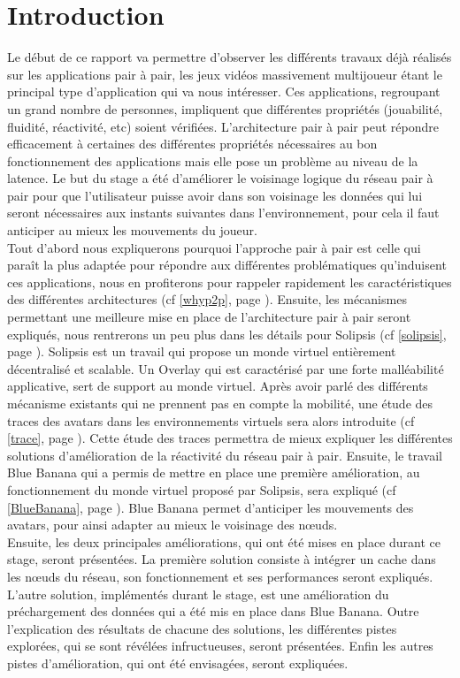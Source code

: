 \section{Introduction}
	Le début de ce rapport va permettre d'observer les différents travaux déjà réalisés sur les applications pair à pair, les jeux vidéos massivement multijoueur étant le principal type d'application qui va nous intéresser. Ces applications, regroupant un grand nombre de personnes, impliquent que différentes propriétés (jouabilité, fluidité, réactivité, etc) soient vérifiées. L'architecture pair à pair peut répondre efficacement à certaines des différentes propriétés nécessaires au bon fonctionnement des applications mais elle pose un problème au niveau de la latence. Le but du stage a été d'améliorer le voisinage logique du réseau pair à pair pour que l'utilisateur puisse avoir dans son voisinage les données qui lui seront nécessaires aux instants suivantes dans l'environnement, pour cela il faut anticiper au mieux les mouvements du joueur.\\

	Tout d'abord nous expliquerons pourquoi l'approche pair à pair est celle qui paraît la plus adaptée pour répondre aux différentes problématiques qu'induisent ces applications, nous en profiterons pour rappeler rapidement les caractéristiques des différentes architectures (cf \ref{whyp2p}, page \pageref{whyp2p}). Ensuite, les mécanismes permettant une meilleure mise en place de l'architecture pair à pair seront expliqués, nous rentrerons un peu plus dans les détails pour Solipsis (cf \ref{solipsis}, page \pageref{solipsis}). Solipsis est un travail qui propose un monde virtuel entièrement décentralisé et scalable. Un Overlay qui est caractérisé par une forte malléabilité applicative, sert de support au monde virtuel. Après avoir parlé des différents mécanisme existants qui ne prennent pas en compte la mobilité, une étude des traces des avatars dans les environnements virtuels sera alors introduite (cf \ref{trace}, page \pageref{trace}). Cette étude des traces permettra de mieux expliquer les différentes solutions d'amélioration de la réactivité du réseau pair à pair. Ensuite, le travail Blue Banana qui a permis de mettre en place une première amélioration, au fonctionnement du monde virtuel proposé par Solipsis, sera expliqué (cf \ref{BlueBanana}, page \pageref{BlueBanana}). Blue Banana permet d'anticiper les mouvements des avatars, pour ainsi adapter au mieux le voisinage des nœuds. \\
	
	Ensuite, les deux principales améliorations, qui ont été mises en place durant ce stage, seront présentées. La première solution consiste à intégrer un cache dans les nœuds du réseau, son fonctionnement et ses performances seront expliqués. L'autre solution, implémentés durant le stage, est une amélioration du préchargement des données qui a été mis en place dans Blue Banana. Outre l'explication des résultats de chacune des solutions, les différentes pistes explorées, qui se sont révélées infructueuses, seront présentées. Enfin les autres pistes d'amélioration, qui ont été envisagées, seront expliquées.

